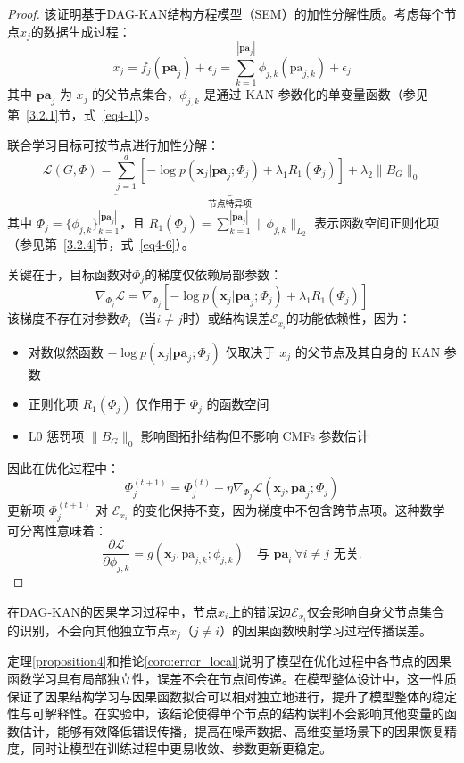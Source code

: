 \begin{proof}
	该证明基于DAG-KAN结构方程模型（SEM）的加性分解性质。考虑每个节点$x_j$的数据生成过程：
	\[
	x_j = f_j(\mathbf{pa}_j) + \epsilon_j = \sum_{k=1}^{|\mathbf{pa}_j|} \phi_{j,k}(\mathrm{pa}_{j,k}) + \epsilon_j
	\]
	其中 $\mathbf{pa}_j$ 为 $x_j$ 的父节点集合，$\phi_{j,k}$ 是通过 KAN 参数化的单变量函数（参见第~\ref{3.2.1}节，式~\ref{eq4-1}）。
	
	联合学习目标可按节点进行加性分解：
	\[
	\mathcal{L}(G, \Phi) = \underbrace{\sum_{j=1}^d \left[ -\log p(\mathbf{x}_j | \mathbf{pa}_j; \Phi_j) + \lambda_1 R_1(\Phi_j) \right]}_{\text{节点特异项}} + \lambda_2 \|B_G\|_0
	\]
	其中 $\Phi_j = \{\phi_{j,k}\}_{k=1}^{|\mathbf{pa}_j|}$，且 $R_1(\Phi_j) = \sum_{k=1}^{|\mathbf{pa}_j|} \|\phi_{j,k}\|_{L_2}$ 表示函数空间正则化项（参见第~\ref{3.2.4}节，式~\ref{eq4-6}）。
	
	关键在于，目标函数对$\Phi_j$的梯度仅依赖局部参数：
	\[
	\nabla_{\Phi_j} \mathcal{L} = \nabla_{\Phi_j} \left[ -\log p(\mathbf{x}_j | \mathbf{pa}_j; \Phi_j) + \lambda_1 R_1(\Phi_j) \right]
	\]
	该梯度不存在对参数$\Phi_i$（当$i \neq j$时）或结构误差$\mathcal{E}_{x_i}$的功能依赖性，因为：
	\begin{itemize}
		\item 对数似然函数 $-\log p(\mathbf{x}_j | \mathbf{pa}_j; \Phi_j)$ 仅取决于 $x_j$ 的父节点及其自身的 KAN 参数
		\item 正则化项 $R_1(\Phi_j)$ 仅作用于 $\Phi_j$ 的函数空间
		\item L0 惩罚项 $\|B_G\|_0$ 影响图拓扑结构但不影响 CMFs 参数估计
	\end{itemize}
	
	因此在优化过程中：
	\[
	\Phi_j^{(t+1)} = \Phi_j^{(t)} - \eta \nabla_{\Phi_j} \mathcal{L}(\mathbf{x}_j, \mathbf{pa}_j; \Phi_j)
	\]
	更新项 $\Phi_j^{(t+1)}$ 对 $\mathcal{E}_{x_i}$ 的变化保持不变，因为梯度中不包含跨节点项。这种数学可分离性意味着：
	\[
	\frac{\partial \mathcal{L}}{\partial \phi_{j,k}} = g(\mathbf{x}_j, \mathrm{pa}_{j,k}; \phi_{j,k}) \quad \text{与 } \mathbf{pa}_i \ \forall i \neq j \text{ 无关}.
	\]
\end{proof}

\begin{corollary}[错误边的误差局部性]
	\label{coro:error_local}
	在DAG-KAN的因果学习过程中，节点$x_i$上的错误边$\mathcal{E}_{x_i}$仅会影响自身父节点集合的识别，不会向其他独立节点$x_j$（$j\neq i$）的因果函数映射学习过程传播误差。
\end{corollary}

定理\ref{proposition4}和推论\ref{coro:error_local}说明了模型在优化过程中各节点的因果函数学习具有局部独立性，误差不会在节点间传递。在模型整体设计中，这一性质保证了因果结构学习与因果函数拟合可以相对独立地进行，提升了模型整体的稳定性与可解释性。在实验中，该结论使得单个节点的结构误判不会影响其他变量的函数估计，能够有效降低错误传播，提高在噪声数据、高维变量场景下的因果恢复精度，同时让模型在训练过程中更易收敛、参数更新更稳定。

